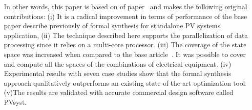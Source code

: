 \documentclass[10pt,journal,compsoc]{IEEEtran}
\begin{document}
In other words, this paper is based on of paper~\cite{VSTTE2020}  and makes the following original contributions: (i) It is a radical improvement in terms of performance of the base paper describe previously of formal synthesis for standalone PV systems application, (ii) The technique described here supports the parallelization of data processing since it relies on a multi-core processor. (iii) The coverage of the state space was increased when compared to the base article~\cite{VSTTE2020}. It was possible to cover and compute all the spaces of the combinations of electrical equipment. (iv) Experimental results with seven case studies show that the formal synthesis approach qualitatively outperforms an existing state-of-the-art optimization tool.  (v)The results are validated with accurate commercial design software called PVsyst.


\end{document}
